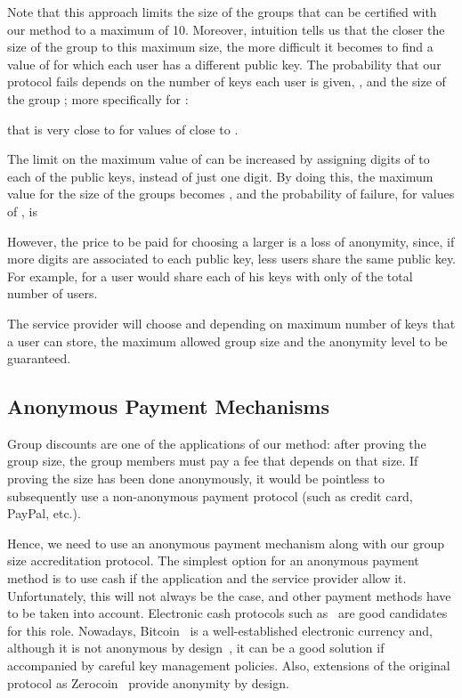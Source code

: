 \documentclass[11pt]{llncs}
\begin{document}
Note that this approach limits the size of the groups
that can be certified with our method to a maximum
of 10. Moreover, intuition tells us that
the closer the size of the group to this maximum size,
the more difficult it becomes to find a value of  for
which each user has a different public key.
The probability that our protocol fails depends
on the number of keys each user is given, , and
the size of the group ; more specifically for
:

that is very close to  for values of  close to
.

The limit on the maximum value of  can be
increased by assigning  digits of  to each
of the  public keys,
instead of just one digit.
By doing this, the maximum value for the size
of the groups becomes , and the probability of
failure, for values of , is


However, the price to be paid for choosing a larger
 is a loss of anonymity,
since, if more digits are associated to each public key,
less users share the same public key. For example,
for  a user would share each of his keys with
only  of the total number of users.

The service provider will choose  and 
depending on maximum number of keys that a user can store,
the maximum allowed group size and the anonymity level
to be guaranteed.


\subsection{Anonymous Payment Mechanisms}\label{ab.subsec.payment}

Group discounts are one of the applications of our method:
after proving the group size, the group
members must pay a fee that depends on that
size. If proving the size has been done anonymously,
it would be pointless to subsequently use a
non-anonymous payment protocol (such as credit card, PayPal, etc.).

Hence, we need to use an anonymous
payment mechanism along with our group size accreditation
protocol.
The simplest option for an anonymous payment method
is to use cash if the application and the service provider
allow it. Unfortunately, this will not always be the case,
and other payment methods have to be taken into account.
Electronic cash protocols such as~\cite{ab.Chaum1990}
are good candidates for this role.
Nowadays, Bitcoin~\cite{ab.Nakamoto2008}
is a well-established electronic currency and, although
it is not anonymous by design~\cite{ab.Reid2013},
it can be a good solution if accompanied by careful
key management policies.
Also, extensions of the original protocol as
Zerocoin~\cite{ab.Miers2013} provide
anonymity by design.
\end{document}

